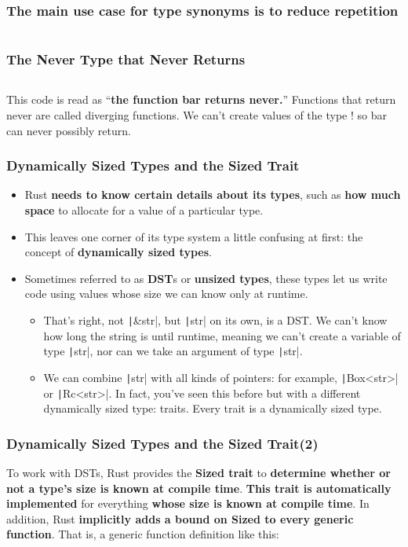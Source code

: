\documentclass{beamer}
\begin{document}
\begin{frame}[fragile]
	\frametitle{The main use case for type synonyms is to reduce repetition}
	
	\inputminted{rust}{./code/type4.rs}
\end{frame}


\begin{frame}[fragile]
	\frametitle{The Never Type that Never Returns}
	
	\inputminted{rust}{./code/type5.rs}
	
	This code is read as “\textbf{the function bar returns never.}” Functions that return never are called diverging functions. We can’t create values of the type ! so bar can never possibly return.
\end{frame}


\begin{frame}[fragile]
	\frametitle{Dynamically Sized Types and the Sized Trait}
	\begin{itemize}
		\item Rust \textbf{needs to know certain details about its types}, such as \textbf{how much space} to allocate for a value of a particular type. 
		\item 	This leaves one corner of its type system a little confusing at first: the concept of \textbf{dynamically sized types}.
		\item 	Sometimes referred to as \textbf{DST}s or \textbf{unsized types}, these types let us write code using values whose size we can know only at runtime.
		 \begin{itemize}
		 	\item That’s right, not \texttt|&str|, but \texttt|str| on its own, is a DST. We can’t know how long the string is until runtime, meaning we can’t create a variable of type \texttt|str|, nor can we take an argument of type \texttt|str|.
		 	\item 	 We can combine \texttt|str| with all kinds of pointers: for example, \texttt|Box<str>| or \texttt|Rc<str>|. In fact, you’ve seen this before but with a different dynamically sized type: traits. Every trait is a dynamically sized type.
		 \end{itemize}
	\end{itemize}
	 
\end{frame}

\begin{frame}[fragile]
	\frametitle{Dynamically Sized Types and the Sized Trait(2)}
To work with DSTs, Rust provides the \textbf{Sized trait }to \textbf{determine whether or not a type’s size is known at compile time}. \textbf{This trait is automatically implemented} for everything \textbf{whose size is known at compile time}. In addition, Rust\textbf{ implicitly adds a bound on Sized to every generic function}. That is, a generic function definition like this:
	
	\inputminted{rust}{./code/type6.rs}
	
\end{frame}
\end{document}
